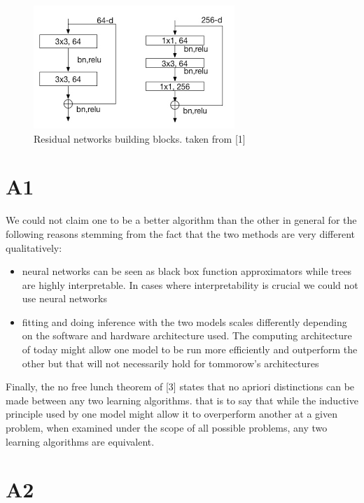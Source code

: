 \documentclass[12pt,twoside]{article}
\begin{document}
\begin{figure}[H]
\centering %
\includegraphics[width = 0.6\hsize]{./figures/skip_connections.png} %
\caption{Residual networks building blocks. taken from [1]} %
\label{fig:skip_connections} %
\end{figure}

\newpage
\section{A1}
We could not claim one to be a better algorithm than the other in general for the following reasons stemming from the fact that the two methods are very different qualitatively:
\begin{itemize}
\item neural networks can be seen as black box function approximators while trees are highly interpretable. In cases where interpretability is crucial we could not use neural networks
\item fitting and doing inference with the two models scales differently depending on the software and hardware architecture used. The computing architecture of today might allow one model to be run more efficiently and outperform the other but that will not necessarily hold for tommorow's architectures
\end{itemize}
Finally, the no free lunch theorem of [3] states that no apriori distinctions can be made between any two learning algorithms. that is to say that while the inductive principle used by one model might allow it to overperform another at a given problem, when examined under the scope of all possible problems, any two learning algorithms are equivalent.


\section{A2}
\end{document}
